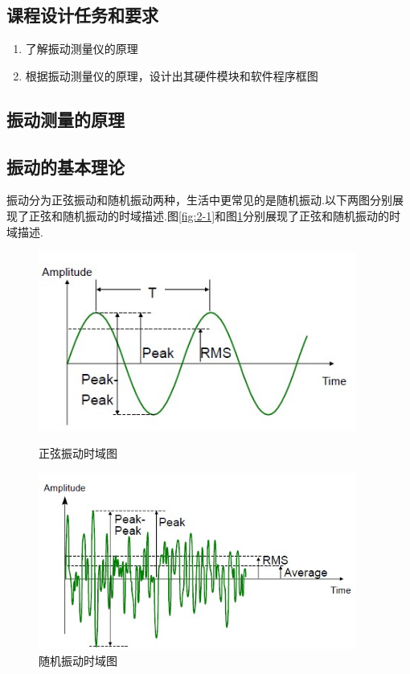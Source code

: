 \documentclass[12pt,a4paper,citestyle=gb7714-2015, bibstyle=gb7714-2015,bibtex]{HDUPaper}
\begin{document}
\subsection{课程设计任务和要求}
\begin{enumerate}
  \item 了解振动测量仪的原理
  \item 根据振动测量仪的原理，设计出其硬件模块和软件程序框图
\end{enumerate}
\newpage
\begin{center}
  \section{振动测量的原理}
\end{center}
\subsection{振动的基本理论}
振动分为正弦振动和随机振动两种，生活中更常见的是随机振动.以下两图分别展现了正弦和随机振动的时域描述.图\ref{fig:2-1}和图\ref{fig:2-2}分别展现了正弦和随机振动的时域描述\cite{en2}.
\begin{figure}[h]
  \centering
  \begin{minipage}[t]{0.48\textwidth}
  \centering
  \includegraphics[width=0.93\textwidth]{image/1.jpg}
  \caption{正弦振动时域图}\label{fig:2-1}
  \end{minipage}
  \begin{minipage}[t]{0.48\textwidth}
  \centering
  \includegraphics[width=0.93\textwidth]{image/2.jpg}
  \caption{随机振动时域图}\label{fig:2-2}
  \end{minipage}
  \end{figure}
\end{document}
